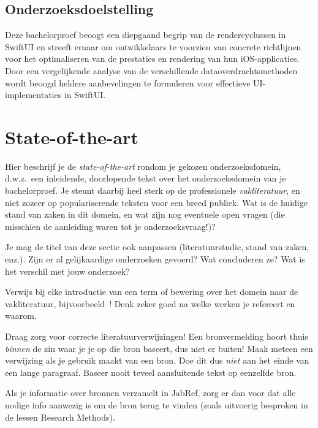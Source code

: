 \subsection{Onderzoeksdoelstelling}
Deze bachelorproef beoogt een diepgaand begrip van de rendercyclussen in SwiftUI en streeft ernaar om ontwikkelaars te voorzien van concrete richtlijnen voor het optimaliseren van de prestaties en rendering van hun iOS-applicaties. Door een vergelijkende analyse van de verschillende dataoverdrachtsmethoden wordt beoogd heldere aanbevelingen te formuleren voor effectieve UI-implementaties in SwiftUI.



\section{State-of-the-art}%
\label{sec:state-of-the-art}

Hier beschrijf je de \emph{state-of-the-art} rondom je gekozen onderzoeksdomein, d.w.z.\ een inleidende, doorlopende tekst over het onderzoeksdomein van je bachelorproef. Je steunt daarbij heel sterk op de professionele \emph{vakliteratuur}, en niet zozeer op populariserende teksten voor een breed publiek. Wat is de huidige stand van zaken in dit domein, en wat zijn nog eventuele open vragen (die misschien de aanleiding waren tot je onderzoeksvraag!)?

Je mag de titel van deze sectie ook aanpassen (literatuurstudie, stand van zaken, enz.). Zijn er al gelijkaardige onderzoeken gevoerd? Wat concluderen ze? Wat is het verschil met jouw onderzoek?

Verwijs bij elke introductie van een term of bewering over het domein naar de vakliteratuur, bijvoorbeeld~\autocite{Hykes2013}! Denk zeker goed na welke werken je refereert en waarom.

Draag zorg voor correcte literatuurverwijzingen! Een bronvermelding hoort thuis \emph{binnen} de zin waar je je op die bron baseert, dus niet er buiten! Maak meteen een verwijzing als je gebruik maakt van een bron. Doe dit dus \emph{niet} aan het einde van een lange paragraaf. Baseer nooit teveel aansluitende tekst op eenzelfde bron.

Als je informatie over bronnen verzamelt in JabRef, zorg er dan voor dat alle nodige info aanwezig is om de bron terug te vinden (zoals uitvoerig besproken in de lessen Research Methods).


